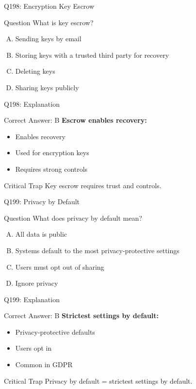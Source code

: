 \documentclass{beamer}
\begin{document}
	\begin{frame}{Q198: Encryption Key Escrow}
		\begin{block}{Question}
			What is key escrow?
		\end{block}
		\begin{enumerate}[(A)]
			\item Sending keys by email
			\item Storing keys with a trusted third party for recovery
			\item Deleting keys
			\item Sharing keys publicly
		\end{enumerate}
	\end{frame}
	
	\begin{frame}{Q198: Explanation}
		\begin{block}{Correct Answer: B}
			\textbf{Escrow enables recovery:}
			\begin{itemize}
				\item Enables recovery
				\item Used for encryption keys
				\item Requires strong controls
			\end{itemize}
		\end{block}
		\begin{alertblock}{Critical Trap}
			Key escrow requires trust and controls.
		\end{alertblock}
	\end{frame}
	
	\begin{frame}{Q199: Privacy by Default}
		\begin{block}{Question}
			What does privacy by default mean?
		\end{block}
		\begin{enumerate}[(A)]
			\item All data is public
			\item Systems default to the most privacy-protective settings
			\item Users must opt out of sharing
			\item Ignore privacy
		\end{enumerate}
	\end{frame}
	
	\begin{frame}{Q199: Explanation}
		\begin{block}{Correct Answer: B}
			\textbf{Strictest settings by default:}
			\begin{itemize}
				\item Privacy-protective defaults
				\item Users opt in
				\item Common in GDPR
			\end{itemize}
		\end{block}
		\begin{alertblock}{Critical Trap}
			Privacy by default = strictest settings by default.
		\end{alertblock}
	\end{frame}
	
\end{document}
